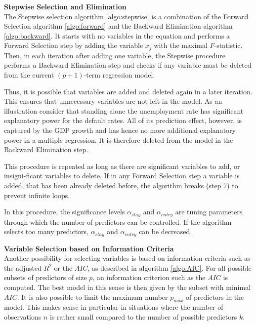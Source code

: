 \documentclass[a4paper, 11pt]{scrreprt}
\begin{document}
\bigskip 
\textbf{Stepwise Selection and Elimination} \\
The Stepwise selection algorithm \ref{algo:stepwise} is a combination of the Forward Selection algorithm \ref{algo:forward} and the Backward Elimination algorithm \ref{algo:backward}.
It starts with no variables in the equation and performs a Forward Selection step by adding the variable $x_j$ with the maximal $F$-statistic. Then, in each iteration after adding one variable, the Stepwise procedure performs a Backward Elimination step and checks if any variable must be deleted from the current $(p+1)$-term regression model.

Thus, it is possible that variables are added and deleted again in a later iteration. This ensures that unnecessary variables are not left in the model. As an illustration consider that standing alone the unemployment rate has significant explanatory power for the default rates. All of its prediction effect, however, is captured by the GDP growth and has hence no more additional explanatory power in a multiple regression. It is therefore deleted from the model in the Backward Elimination step.

This procedure is repeated as long as there are significant variables to add, or insigni-ficant variables to delete. If in any Forward Selection step a variable is added, that has been already deleted before, the algorithm breaks (step 7) to prevent infinite loops.

In this procedure, the significance levels $\alpha_{stay}$ and $\alpha_{entry}$ are tuning parameters through which the number of predictors can be controlled.
If the algorithm selects too many predictors, $\alpha_{stay}$ and $\alpha_{entry}$ can be decreased.


\bigskip 
\textbf{Variable Selection based on Information Criteria} \\
Another possibility for selecting variables is based on information criteria such as the adjusted $R^2$ or the $AIC$, as described in algorithm \ref{algo:AIC}.
For all possible subsets of predictors of size $p$, an information criterion such as the $AIC$ is computed. The best model in this sense is then given by the subset with minimal $AIC$. It is also possible to limit the maximum number $p_{max}$ of predictors in the model. This makes sense in particular in situations where the number of observations $n$ is rather small compared to the number of possible predictors $k$.
\end{document}
